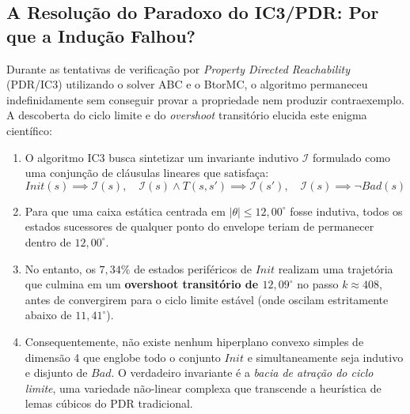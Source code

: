 \documentclass[11pt,a4paper]{article}
\theoremstyle{definition}
\begin{document}
\subsection{A Resolução do Paradoxo do IC3/PDR: Por que a Indução Falhou?}

Durante as tentativas de verificação por \textit{Property Directed Reachability} (PDR/IC3) utilizando o solver ABC e o BtorMC, o algoritmo permaneceu indefinidamente sem conseguir provar a propriedade nem produzir contraexemplo. A descoberta do ciclo limite e do \textit{overshoot} transitório elucida este enigma científico:

\begin{enumerate}
    \item O algoritmo IC3 busca sintetizar um invariante indutivo $\mathcal{I}$ formulado como uma conjunção de cláusulas lineares que satisfaça:
    \begin{equation}
        Init(s) \implies \mathcal{I}(s), \quad \mathcal{I}(s) \land T(s, s') \implies \mathcal{I}(s'), \quad \mathcal{I}(s) \implies \neg Bad(s)
    \end{equation}
    \item Para que uma caixa estática centrada em $|\theta| \le 12{,}00^\circ$ fosse indutiva, todos os estados sucessores de qualquer ponto do envelope teriam de permanecer dentro de $12{,}00^\circ$.
    \item No entanto, os $7{,}34\%$ de estados periféricos de $Init$ realizam uma trajetória que culmina em um \textbf{overshoot transitório de $12{,}09^\circ$} no passo $k \approx 408$, antes de convergirem para o ciclo limite estável (onde oscilam estritamente abaixo de $11{,}41^\circ$).
    \item Consequentemente, não existe nenhum hiperplano convexo simples de dimensão 4 que englobe todo o conjunto $Init$ e simultaneamente seja indutivo e disjunto de $Bad$. O verdadeiro invariante é a \textit{bacia de atração do ciclo limite}, uma variedade não-linear complexa que transcende a heurística de lemas cúbicos do PDR tradicional.
\end{enumerate}
\end{document}
